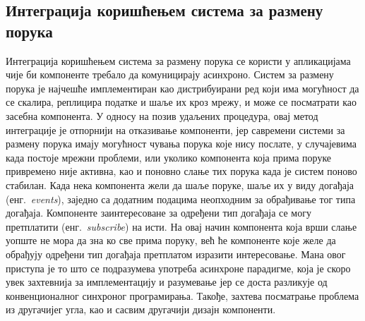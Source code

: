 \documentclass[12pt,oneside]{memoir}
\begin{document}
\subsection{Интеграција коришћењем система за размену порука}
Интеграција коришћењем система за размену порука се користи у апликацијама чије би компоненте требало да комуницирају асинхроно. Систем за размену порука је најчешће имплементиран као дистрибуирани ред који има могућност да се скалира, реплицира податке и шаље их кроз мрежу, и може се посматрати као засебна компонента. У односу на позив удаљених процедура, овај метод интеграције је отпорнији на отказивање компоненти, јер савремени системи за размену порука имају могућност чувања порука које нису послате, у случајевима када постоје мрежни проблеми, или уколико компонента која прима поруке привремено није активна, као и поновно слање тих порука када је систем поново стабилан. Када нека компонента жели да шаље поруке, шаље их у виду догађаја (енг.~\textit{events}), заједно са додатним подацима неопходним за обрађивање тог типа догађаја. Компоненте заинтересоване за одређени тип догађаја се могу претплатити (енг.~\textit{subscribe}) на исти. На овај начин компонента која врши слање уопште не мора да зна ко све прима поруку, већ ће компоненте које желе да обрађују одређени тип догађаја претплатом изразити интересовање. Мана овог приступа је то што се подразумева употреба асинхроне парадигме, која је скоро увек захтевнија за имплементацију и разумевање јер се доста разликује од конвенционалног синхроног програмирања. Такође, захтева посматрање проблема из другачијег угла, као и сасвим другачији дизајн компоненти.
\end{document}
